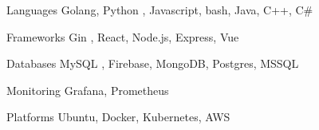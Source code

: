 

\begin{cvskills}

  \cvskill
    {Languages} %
    {Golang, Python} %
    {, Javascript, bash, Java, C++, C\#} %

  \cvskill
    {Frameworks} %
    {Gin} %
    {, React, Node.js, Express, Vue} %

  \cvskill
    {Databases} %
    {MySQL} %
    {, Firebase, MongoDB, Postgres, MSSQL} %

  \cvskill
    {Monitoring} %
    {} %
    {Grafana, Prometheus} %

  \cvskill
    {Platforms} %
    {} %
    {Ubuntu, Docker, Kubernetes, AWS} %

\end{cvskills}
